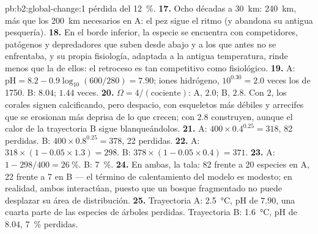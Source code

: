 \begin{solution}{pb:b2:global-change:1}
pérdida del \qty{12}{\%}.
\textbf{17.} Ocho décadas a \qty{30}{km}: \qty{240}{km}, más que los
\qty{200}{km} necesarios en A: el pez sigue el ritmo (y abandona su antigua
pesquería).
\textbf{18.} En el borde inferior, la especie se encuentra con
competidores, patógenos y depredadores que suben desde abajo y a los que
antes no se enfrentaba, y su propia fisiología, adaptada a la antigua
temperatura, rinde menos que la de ellos: el retroceso es tan competitivo
como fisiológico.
\textbf{19.} A: $\mathrm{pH} = 8.2 - 0.9\log_{10}(600/280) = 7.90$;
iones hidrógeno, $10^{0.30} = 2.0$ veces los de 1750. B: $8.04$; $1.44$
veces.
\textbf{20.} $\Omega = 4/(\text{cociente})$: A, $2.0$; B, $2.8$. Con 2, los
corales siguen calcificando, pero despacio, con esqueletos más débiles y
arrecifes que se erosionan más deprisa de lo que crecen; con $2.8$
construyen, aunque el calor de la trayectoria B sigue blanqueándolos.
\textbf{21.} A: $400\times 0.4^{0.25} = 318$, 82 perdidas. B:
$400\times 0.8^{0.25} = 378$, 22 perdidas.
\textbf{22.} A: $318\times(1 - 0.05\times 1.3) = 298$. B:
$378\times(1 - 0.05\times 0.4) = 371$.
\textbf{23.} A: $1 - 298/400 = \qty{26}{\%}$. B: \qty{7}{\%}.
\textbf{24.} En ambas, la tala: 82 frente a 20 especies en A, 22 frente a 7
en B --- el término de calentamiento del modelo es modesto; en realidad,
ambos interactúan, puesto que un bosque fragmentado no puede desplazar su
área de distribución.
\textbf{25.} Trayectoria A: \qty{2.5}{\celsius}, pH de $7.90$, una cuarta
parte de las especies de árboles perdidas. Trayectoria B:
\qty{1.6}{\celsius}, pH de $8.04$, \qty{7}{\%} perdidas.
\end{solution}
